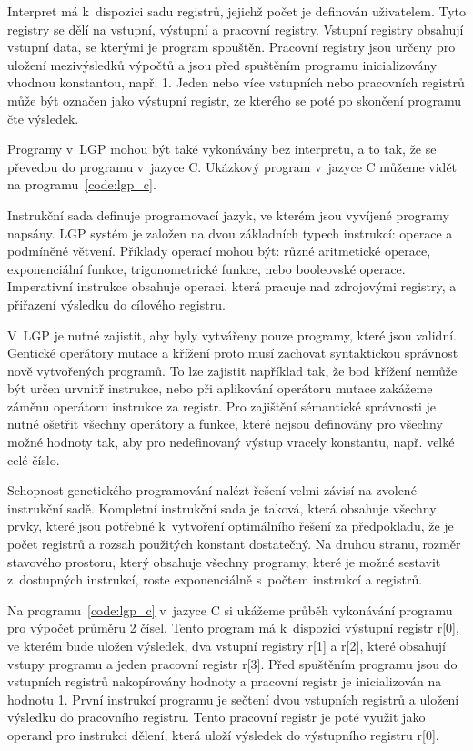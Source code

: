 Interpret má k~dispozici sadu registrů, jejichž počet je definován uživatelem.
Tyto registry se dělí na vstupní, výstupní a pracovní registry.
Vstupní registry obsahují vstupní data, se kterými je program spouštěn.
Pracovní registry jsou určeny pro uložení mezivýsledků výpočtů a jsou před spuštěním programu inicializovány vhodnou konstantou, např. 1.
Jeden nebo více vstupních nebo pracovních registrů může být označen jako výstupní registr, ze kterého se poté po skončení programu čte výsledek.

Programy v~LGP mohou být také vykonávány bez interpretu, a to tak, že se převedou do programu v~jazyce C\@.
Ukázkový program v~jazyce C můžeme vidět na programu~\ref{code:lgp_c}.

Instrukční sada definuje programovací jazyk, ve kterém jsou vyvíjené programy napsány.
LGP systém je založen na dvou základních typech instrukcí: operace a podmíněné větvení.
Příklady operací mohou být: různé aritmetické operace, exponenciální funkce, trigonometrické funkce, nebo booleovské operace.
Imperativní instrukce obsahuje operaci, která pracuje nad zdrojovými registry, a přiřazení výsledku do cílového registru.

V~LGP je nutné zajistit, aby byly vytvářeny pouze programy, které jsou validní.
Gentické operátory mutace a křížení proto musí zachovat syntaktickou správnost nově vytvořených programů.
To lze zajistit například tak, že bod křížení nemůže být určen urvnitř instrukce, nebo při aplikování operátoru mutace zakážeme záměnu operátoru instrukce za registr.
Pro zajištění sémantické správnosti je nutné ošetřit všechny operátory a funkce, které nejsou definovány pro všechny možné hodnoty tak, aby pro nedefinovaný výstup vracely konstantu, např. velké celé číslo.

Schopnost genetického programování nalézt řešení velmi závisí na zvolené instrukční sadě.
Kompletní instrukční sada je taková, která obsahuje všechny prvky, které jsou potřebné k~vytvoření optimálního řešení za předpokladu, že je počet registrů a rozsah použitých konstant dostatečný.
Na druhou stranu, rozměr stavového prostoru, který obsahuje všechny programy, které je možné sestavit z~dostupných instrukcí, roste exponenciálně s~počtem instrukcí a registrů.

Na programu~\ref{code:lgp_c} v~jazyce C si ukážeme průběh vykonávání programu pro výpočet průměru 2 čísel.
Tento program má k~dispozici výstupní registr r[0], ve kterém bude uložen výsledek, dva vstupní registry r[1] a r[2], které obsahují vstupy programu a jeden pracovní registr r[3].
Před spuštěním programu jsou do vstupních registrů nakopírovány hodnoty a pracovní registr je inicializován na hodnotu 1.
První instrukcí programu je sečtení dvou vstupních registrů a uložení výsledku do pracovního registru.
Tento pracovní registr je poté využit jako operand pro instrukci dělení, která uloží výsledek do výstupního registru r[0].


